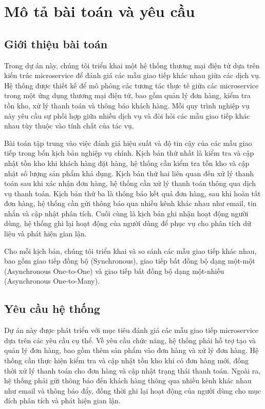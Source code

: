 \section{Mô tả bài toán và yêu cầu}

\subsection{Giới thiệu bài toán}
Trong dự án này, chúng tôi triển khai một hệ thống thương mại điện tử dựa trên kiến trúc microservice để đánh giá các mẫu giao tiếp khác nhau giữa các dịch vụ. Hệ thống được thiết kế để mô phỏng các tương tác thực tế giữa các microservice trong một ứng dụng thương mại điện tử, bao gồm quản lý đơn hàng, kiểm tra tồn kho, xử lý thanh toán và thông báo khách hàng. Mỗi quy trình nghiệp vụ này yêu cầu sự phối hợp giữa nhiều dịch vụ và đòi hỏi các mẫu giao tiếp khác nhau tùy thuộc vào tính chất của tác vụ.

Bài toán tập trung vào việc đánh giá hiệu suất và độ tin cậy của các mẫu giao tiếp trong bốn kịch bản nghiệp vụ chính. Kịch bản thứ nhất là kiểm tra và cập nhật tồn kho khi khách hàng đặt hàng, hệ thống cần kiểm tra tồn kho và cập nhật số lượng sản phẩm khả dụng. Kịch bản thứ hai liên quan đến xử lý thanh toán sau khi xác nhận đơn hàng, hệ thống cần xử lý thanh toán thông qua dịch vụ thanh toán. Kịch bản thứ ba là thông báo kết quả đơn hàng, sau khi hoàn tất đơn hàng, hệ thống cần gửi thông báo qua nhiều kênh khác nhau như email, tin nhắn và cập nhật phân tích. Cuối cùng là kịch bản ghi nhận hoạt động người dùng, hệ thống ghi lại hoạt động của người dùng để phục vụ cho phân tích dữ liệu và phát hiện gian lận.

Cho mỗi kịch bản, chúng tôi triển khai và so sánh các mẫu giao tiếp khác nhau, bao gồm giao tiếp đồng bộ (Synchronous), giao tiếp bất đồng bộ dạng một-một (Asynchronous One-to-One) và giao tiếp bất đồng bộ dạng một-nhiều (Asynchronous One-to-Many).

\subsection{Yêu cầu hệ thống}
Dự án này được phát triển với mục tiêu đánh giá các mẫu giao tiếp microservice dựa trên các yêu cầu cụ thể. Về yêu cầu chức năng, hệ thống phải hỗ trợ tạo và quản lý đơn hàng, bao gồm thêm sản phẩm vào đơn hàng và xử lý đơn hàng. Hệ thống cần thực hiện kiểm tra và cập nhật tồn kho khi có đơn hàng mới, đồng thời xử lý thanh toán cho đơn hàng và cập nhật trạng thái thanh toán. Ngoài ra, hệ thống phải gửi thông báo đến khách hàng thông qua nhiều kênh khác nhau như email và thông báo đẩy, đồng thời ghi lại hoạt động của người dùng cho mục đích phân tích và phát hiện gian lận.

